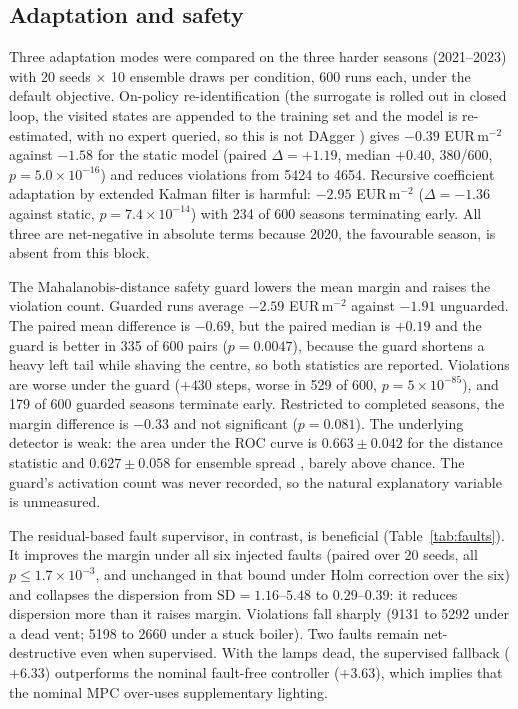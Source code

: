\subsection{Adaptation and safety}
\label{sec:res-safety}

Three adaptation modes were compared on the three harder seasons (2021--2023) with 20
seeds $\times$ 10 ensemble draws per condition, 600 runs each, under the default
objective. On-policy re-identification (the surrogate is rolled out in closed loop, the visited states are appended to the training set and the model is re-estimated, with no expert queried, so this is not DAgger \cite{ross2011}) gives $-0.39$ EUR\,m$^{-2}$
against $-1.58$ for the static model (paired $\Delta = +1.19$, median $+0.40$, 380/600,
$p=5.0\times10^{-16}$) and reduces violations from 5424 to 4654. Recursive coefficient
adaptation by extended Kalman filter is harmful: $-2.95$ EUR\,m$^{-2}$
($\Delta = -1.36$ against static, $p=7.4\times10^{-14}$) with 234 of 600 seasons
terminating early. All three are net-negative in absolute terms because 2020, the
favourable season, is absent from this block.

The Mahalanobis-distance safety guard \cite{mahalanobis1936,lee2018} lowers the mean
margin and raises the violation count. Guarded runs average $-2.59$ EUR\,m$^{-2}$ against
$-1.91$ unguarded. The paired mean difference is $-0.69$, but the paired median is $+0.19$
and the guard is better in 335 of 600 pairs ($p=0.0047$), because the guard shortens a
heavy left tail while shaving the centre, so both statistics are reported. Violations are
worse under the guard ($+430$ steps, worse in 529 of 600, $p=5\times10^{-85}$), and 179 of
600 guarded seasons terminate early. Restricted to completed seasons, the margin
difference is $-0.33$ and not significant ($p=0.081$). The underlying detector is weak: the
area under the ROC curve is $0.663\pm0.042$ for the distance statistic and $0.627\pm0.058$
for ensemble spread \cite{lakshminarayanan2017}, barely above chance. The guard's
activation count was never recorded, so the natural explanatory variable is unmeasured.

The residual-based fault supervisor, in contrast, is beneficial (Table~\ref{tab:faults}). It
improves the margin under all six injected faults (paired over 20 seeds, all
$p\le1.7\times10^{-3}$, and unchanged in that bound under Holm correction over the six)
and collapses the
dispersion from $\text{SD}=1.16$--$5.48$ to $0.29$--$0.39$: it reduces dispersion more
than it raises margin. Violations fall sharply (9131 to 5292 under a dead vent; 5198 to
2660 under a stuck boiler). Two faults remain net-destructive even when supervised. With
the lamps dead, the supervised fallback ($+6.33$) outperforms the nominal fault-free
controller ($+3.63$), which implies that the nominal MPC over-uses supplementary lighting.

